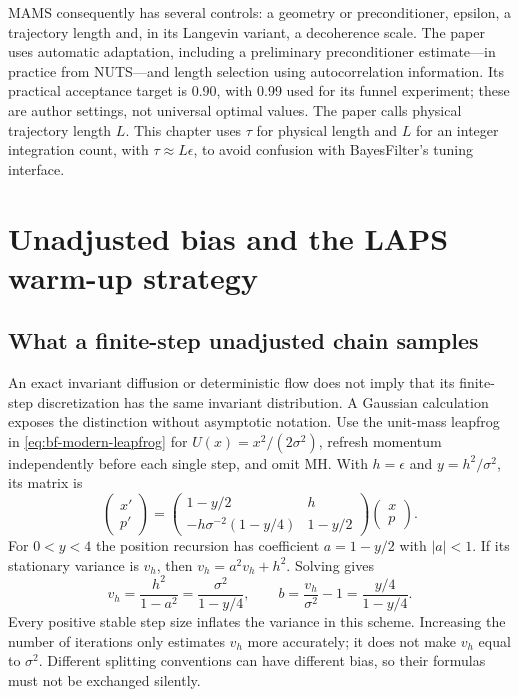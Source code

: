 MAMS consequently has several controls: a geometry or preconditioner,
epsilon, a trajectory length and, in its Langevin variant, a decoherence
scale. The paper uses automatic adaptation, including a preliminary
preconditioner estimate---in practice from NUTS---and length selection using
autocorrelation information. Its practical acceptance target is 0.90, with
0.99 used for its funnel experiment; these are author settings, not universal
optimal values. The paper calls physical trajectory length $L$. This chapter
uses $\tau$ for physical length and $L$ for an integer integration count,
with $\tau\approx L\epsilon$, to avoid confusion with BayesFilter's tuning
interface.

\section{Unadjusted bias and the LAPS warm-up strategy}
\label{sec:bf-modern-laps}

\subsection{What a finite-step unadjusted chain samples}

An exact invariant diffusion or deterministic flow does not imply that its
finite-step discretization has the same invariant distribution. A Gaussian
calculation exposes the distinction without asymptotic notation. Use the
unit-mass leapfrog in \eqref{eq:bf-modern-leapfrog} for
$U(x)=x^2/(2\sigma^2)$, refresh momentum independently before each single
step, and omit MH. With $h=\epsilon$ and $y=h^2/\sigma^2$, its matrix is
\begin{equation}
 \begin{pmatrix}x'\\p'\end{pmatrix}
 =
 \begin{pmatrix}
  1-y/2 & h\\
  -h\sigma^{-2}(1-y/4)&1-y/2
 \end{pmatrix}
 \begin{pmatrix}x\\p\end{pmatrix}.
 \label{eq:bf-modern-gaussian-leapfrog-matrix}
\end{equation}
For $0<y<4$ the position recursion has coefficient $a=1-y/2$ with
$|a|<1$. If its stationary variance is $v_h$, then
$v_h=a^2v_h+h^2$. Solving gives
\begin{equation}
 v_h=\frac{h^2}{1-a^2}
     =\frac{\sigma^2}{1-y/4},\qquad
 b=\frac{v_h}{\sigma^2}-1=\frac{y/4}{1-y/4}.
 \label{eq:bf-modern-gaussian-biased-variance}
\end{equation}
Every positive stable step size inflates the variance in this scheme.
Increasing the number of iterations only estimates $v_h$ more accurately;
it does not make $v_h$ equal to $\sigma^2$. Different splitting conventions
can have different bias, so their formulas must not be exchanged silently.

